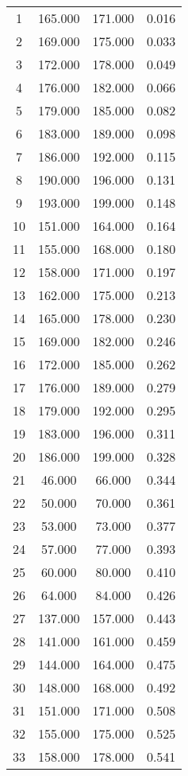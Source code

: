 % 
\begin{tabular}{cccc}
  \hline
  \hline
1 & 165.000 & 171.000 & 0.016 \\ 
  2 & 169.000 & 175.000 & 0.033 \\ 
  3 & 172.000 & 178.000 & 0.049 \\ 
  4 & 176.000 & 182.000 & 0.066 \\ 
  5 & 179.000 & 185.000 & 0.082 \\ 
  6 & 183.000 & 189.000 & 0.098 \\ 
  7 & 186.000 & 192.000 & 0.115 \\ 
  8 & 190.000 & 196.000 & 0.131 \\ 
  9 & 193.000 & 199.000 & 0.148 \\ 
  10 & 151.000 & 164.000 & 0.164 \\ 
  11 & 155.000 & 168.000 & 0.180 \\ 
  12 & 158.000 & 171.000 & 0.197 \\ 
  13 & 162.000 & 175.000 & 0.213 \\ 
  14 & 165.000 & 178.000 & 0.230 \\ 
  15 & 169.000 & 182.000 & 0.246 \\ 
  16 & 172.000 & 185.000 & 0.262 \\ 
  17 & 176.000 & 189.000 & 0.279 \\ 
  18 & 179.000 & 192.000 & 0.295 \\ 
  19 & 183.000 & 196.000 & 0.311 \\ 
  20 & 186.000 & 199.000 & 0.328 \\ 
  21 & 46.000 & 66.000 & 0.344 \\ 
  22 & 50.000 & 70.000 & 0.361 \\ 
  23 & 53.000 & 73.000 & 0.377 \\ 
  24 & 57.000 & 77.000 & 0.393 \\ 
  25 & 60.000 & 80.000 & 0.410 \\ 
  26 & 64.000 & 84.000 & 0.426 \\ 
  27 & 137.000 & 157.000 & 0.443 \\ 
  28 & 141.000 & 161.000 & 0.459 \\ 
  29 & 144.000 & 164.000 & 0.475 \\ 
  30 & 148.000 & 168.000 & 0.492 \\ 
  31 & 151.000 & 171.000 & 0.508 \\ 
  32 & 155.000 & 175.000 & 0.525 \\ 
  33 & 158.000 & 178.000 & 0.541 \\ 

\end{tabular}
